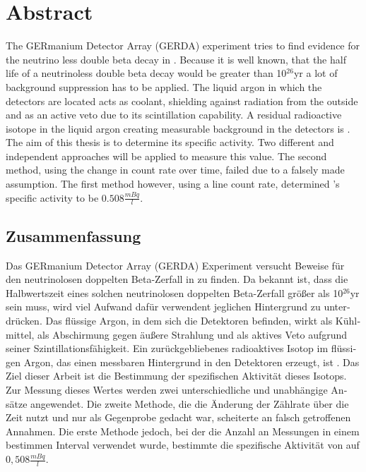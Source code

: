 \documentclass[encoding=utf8,british]{tumphthesis}
\begin{document}



\chapter*{Abstract}
The GERmanium Detector Array (GERDA) experiment tries to find evidence for the neutrino less double beta decay in .
Because it is well known, that the half life of a neutrinoless double beta decay would be greater than 10$^{26}$yr a lot of background suppression has to be applied.
The liquid argon in which the detectors are located acts as coolant, shielding against radiation from the outside and as an active veto due to its scintillation capability.
A residual radioactive isotope in the liquid argon creating measurable background in the detectors is .
The aim of this thesis is to determine its specific activity.
Two different and independent approaches will be applied to measure this value.
The second method, using the change in count rate over time, failed due to a falsely made assumption.
The first method however, using a line count rate, determined 's specific activity to be $0.508\frac{\unit{mBq}}{\unit{l}}$.

\begin{otherlanguage}{ngerman}
\chapter*{Zusammenfassung}
Das GERmanium Detector Array (GERDA) Experiment versucht Beweise für den neutrinolosen doppelten Beta-Zerfall in  zu finden.
Da bekannt ist, dass die Halbwertszeit eines solchen neutrinolosen doppelten Beta-Zerfall größer als 10$^{26}$yr sein muss, wird viel Aufwand dafür verwendent jeglichen Hintergrund zu unterdrücken.
Das flüssige Argon, in dem sich die Detektoren befinden, wirkt als Kühlmittel, als Abschirmung gegen äußere Strahlung und als aktives Veto aufgrund seiner Szintillationsfähigkeit.
Ein zurückgebliebenes radioaktives Isotop im flüssigen Argon, das einen messbaren Hintergrund in den Detektoren erzeugt, ist .
Das Ziel dieser Arbeit ist die Bestimmung der spezifischen Aktivität dieses Isotops.
Zur Messung dieses Wertes werden zwei unterschiedliche und unabhängige Ansätze angewendet.
Die zweite Methode, die die Änderung der Zählrate über die Zeit nutzt und nur als Gegenprobe gedacht war, scheiterte an falsch getroffenen Annahmen.
Die erste Methode jedoch, bei der die Anzahl an Messungen in einem bestimmen Interval verwendet wurde, bestimmte die spezifische Aktivität von  auf $0,508\frac{mBq} {\unit{l}}$.
\end{otherlanguage}
\end{document}
